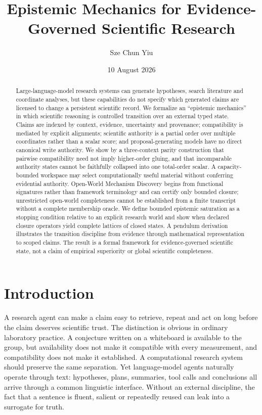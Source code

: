 \documentclass[11pt]{article}
\title{Epistemic Mechanics for Evidence-Governed Scientific Research}
\author{Sze Chun Yiu}
\date{10 August 2026}
\begin{document}
\setlength{\emergencystretch}{3em}
\allowdisplaybreaks
\maketitle

\begin{abstract}
Large-language-model research systems can generate hypotheses, search literature and coordinate analyses, but these capabilities do not specify which generated claims are licensed to change a persistent scientific record. We formalize an ``epistemic mechanics'' in which scientific reasoning is controlled transition over an external typed state. Claims are indexed by context, evidence, uncertainty and provenance; compatibility is mediated by explicit alignments; scientific authority is a partial order over multiple coordinates rather than a scalar score; and proposal-generating models have no direct canonical write authority. We show by a three-context parity construction that pairwise compatibility need not imply higher-order gluing, and that incomparable authority states cannot be faithfully collapsed into one total-order scalar. A capacity-bounded workspace may select computationally useful material without conferring evidential authority. Open-World Mechanism Discovery begins from functional signatures rather than framework terminology and can certify only bounded closure; unrestricted open-world completeness cannot be established from a finite transcript without a complete membership oracle. We define bounded epistemic saturation as a stopping condition relative to an explicit research world and show when declared closure operators yield complete lattices of closed states. A pendulum derivation illustrates the transition discipline from evidence through mathematical representation to scoped claims. The result is a formal framework for evidence-governed scientific state, not a claim of empirical superiority or global scientific completeness.
\end{abstract}

\section{Introduction}

A research agent can make a claim easy to retrieve, repeat and act on long before the claim deserves scientific trust. The distinction is obvious in ordinary laboratory practice. A conjecture written on a whiteboard is available to the group, but availability does not make it compatible with every measurement, and compatibility does not make it established. A computational research system should preserve the same separation. Yet language-model agents naturally operate through text: hypotheses, plans, summaries, tool calls and conclusions all arrive through a common linguistic interface. Without an external discipline, the fact that a sentence is fluent, salient or repeatedly reused can leak into a surrogate for truth.
\end{document}

